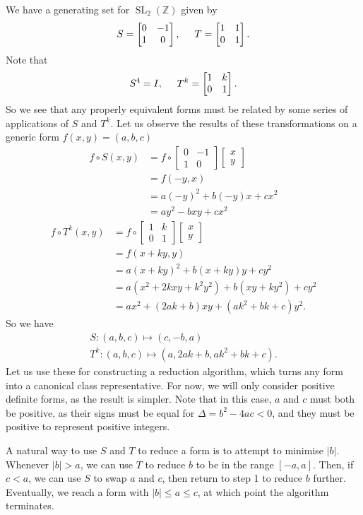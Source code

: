 \documentclass[honours,12pt]{unswthesis}
\newcommand{\Z}{\mathbb{Z}} %
\DeclareMathOperator{\SL}{SL}
\newcommand{\bmat}[1]{\begin{bmatrix}#1\end{bmatrix}}
\numberwithin{equation}{section}
\begin{document}
We have a generating set for $\SL_2(\Z)$ given by
$$S = \bmat{0 & -1 \\ 1 & 0}, \hspace{5mm} T = \bmat{1 & 1 \\ 0 & 1}.$$
Note that
$$S^4 = I, \hspace{5mm} T^k = \bmat{1 & k \\ 0 & 1}.$$
So we see that any properly equivalent forms must be related by some series of applications of $S$ and $T^k$.
Let us observe the results of these transformations on a generic form $f(x, y) = (a, b, c)$
\begin{align*}
    f \circ S (x, y) &= f \circ \bmat{0 & -1 \\ 1 & 0} \bmat{x \\ y} \\
    &= f(-y, x) \\
    &= a(-y)^2 + b(-y)x + cx^2 \\
    &= ay^2 - bxy + cx^2
\end{align*}
\begin{align*}
    f \circ T^k (x, y) &= f \circ \bmat{1 & k \\ 0 & 1} \bmat{x \\ y} \\
    &= f(x + ky, y) \\
    &= a(x + ky)^2 + b(x + ky)y + cy^2 \\
    &= a(x^2 + 2kxy + k^2y^2) + b(xy + ky^2) + cy^2 \\
    &= ax^2 + (2ak + b)xy + (ak^2 + bk + c)y^2.
\end{align*}
So we have
\begin{gather*}
    S : (a, b, c) \mapsto (c, -b, a) \\
    T^k : (a, b, c) \mapsto (a, 2ak + b, ak^2 + bk + c).
\end{gather*}
Let us use these for constructing a reduction algorithm, which turns any form into a canonical class representative.
For now, we will only consider positive definite forms, as the result is simpler.
Note that in this case, $a$ and $c$ must both be positive, as their signs must be equal for $\Delta = b^2 - 4ac < 0$, and they must be positive to represent positive integers.

A natural way to use $S$ and $T$ to reduce a form is to attempt to minimise $|b|$.
Whenever $|b| > a$, we can use $T$ to reduce $b$ to be in the range $[-a, a]$.
Then, if $c < a$, we can use $S$ to swap $a$ and $c$, then return to step 1 to reduce $b$ further.
Eventually, we reach a form with $|b| \leq a \leq c$, at which point the algorithm terminates.
\end{document}
